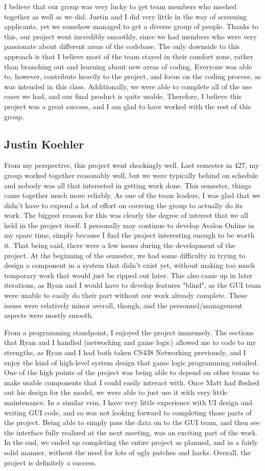 \documentclass{hitec}
\begin{document}
I believe that our group was very lucky to get team members who meshed together as well as we did. Justin and I did very little in the way of screening applicants, yet we somehow managed to get a diverse group of people. Thanks to this, our project went incredibly smoothly, since we had members who were very passionate about different areas of the codebase. The only downside to this approach is that I believe most of the team stayed in their comfort zone, rather than branching out and learning about new areas of coding. Everyone was able to, however, contribute heavily to the project, and focus on the coding process, as was intended in this class. Additionally, we were able to complete all of the use cases we had, and our final product is quite usable. Therefore, I believe this project was a great success, and I am glad to have worked with the rest of this group.
\subsection{Justin Koehler}
From my perspective, this project went shockingly well. Last semester in 427, my group worked together reasonably well, but we were typically behind on schedule and nobody was all that interested in getting work done. This semester, things came together much more reliably. As one of the team leaders, I was glad that we didn't have to expend a lot of effort on coercing the group to actually do its work. The biggest reason for this was clearly the degree of interest that we all held in the project itself. I personally may continue to develop Avalon Online in my spare time, simply because I find the project interesting enough to be worth it. That being said, there were a few issues during the development of the project. At the beginning of the semester, we had some difficulty in trying to design a component in a system that didn't exist yet, without making too much temporary work that would just be ripped out later. This also came up in later iterations, as Ryan and I would have to develop features "blind", as the GUI team were unable to easily do their part without our work already complete. These issues were relatively minor overall, though, and the personnel/management aspects were mostly smooth.

From a programming standpoint, I enjoyed the project immensely. The sections that Ryan and I handled (networking and game logic) allowed me to code to my strengths, as Ryan and I had both taken CS438 Networking previously, and I enjoy the kind of high-level system design that game logic programming entailed. One of the high points of the project was being able to depend on other teams to make usable components that I could easily interact with. Once Matt had fleshed out his design for the model, we were able to just use it with very little maintenance. In a similar vein, I have very little experience with UI design and writing GUI code, and so was not looking forward to completing those parts of the project. Being able to simply pass the data on to the GUI team, and then see the interface fully realized at the next meeting, was an exciting part of the work. In the end, we ended up completing the entire project as planned, and in a fairly solid manner, without the need for lots of ugly patches and hacks. Overall, the project is definitely a success.
\end{document}
